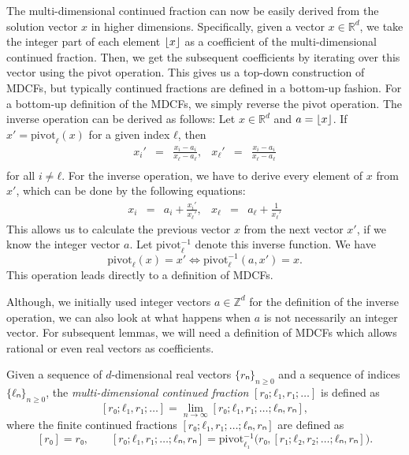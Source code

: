 The multi-dimensional continued fraction can now be easily derived from the
solution vector $x$ in higher dimensions.
Specifically, given a vector $x ∈ ℝ^d$, we take the integer part of each
element $\lfloor x\rfloor$ as a coefficient of the multi-dimensional continued
fraction.
Then, we get the subsequent coefficients by iterating over this vector using
the pivot operation.
This gives us a top-down construction of MDCFs, but typically continued
fractions are defined in a bottom-up fashion.
For a bottom-up definition of the MDCFs, we simply reverse the pivot operation.
The inverse operation can be derived as follows:
Let $x ∈ ℝ^d$ and $a = \lfloor x\rfloor$.
If $x' = \mathrm{pivot}_ℓ(x)$ for a given index $ℓ$, then
\[
  \begin{array}{lcrlcr}
    \displaystyle x_i' & = & \displaystyle \frac{x_i - a_i}{x_ℓ - a_ℓ}, &
    \displaystyle x_ℓ' & = & \displaystyle \frac{x_i - a_i}{x_ℓ - a_ℓ} \\[1em]
  \end{array}
\]
for all $i ≠ ℓ$.
For the inverse operation, we have to derive every element of $x$ from $x'$,
which can be done by the following equations:
\[
  \begin{array}{lcrlcr}
    \displaystyle x_i & = & a_i + \displaystyle \frac{x_i'}{x_ℓ'}, &
    \displaystyle x_ℓ & = & a_ℓ + \displaystyle \frac{1}{x_ℓ'}
  \end{array}
\]
This allows us to calculate the previous vector $x$ from the next vector $x'$,
if we know the integer vector $a$.
Let $\mathrm{pivot}_ℓ^{-1}$ denote this inverse function.
We have
\[
  \mathrm{pivot}_ℓ(x) = x' \iff \mathrm{pivot}_ℓ^{-1}(a, x') = x.
\]
This operation leads directly to a definition of MDCFs.

Although, we initially used integer vectors $a ∈ ℤ^d$ for the definition of the inverse operation,
we can also look at what happens when $a$ is not necessarily an integer vector.
For subsequent lemmas, we will need a definition of MDCFs which allows rational
or even real vectors as coefficients.

\begin{definition}
  Given a sequence of $d$-dimensional real vectors $\{rₙ\}_{n ≥ 0}$ and a sequence of
  indices $\{ℓₙ\}_{n ≥ 0}$, the \emph{multi-dimensional continued fraction} $[r₀; ℓ₁, r₁; …]$
  is defined as
  \[
    [r₀; ℓ₁, r₁; …] = \lim_{n → ∞} [r₀; ℓ₁, r₁; …; ℓₙ, rₙ],
  \]
  where the finite continued fractions $[r₀; ℓ₁, r₁; …; ℓₙ, rₙ]$ are defined as
  \[
    [r₀] = r₀, \qquad [r₀; ℓ₁, r₁; …; ℓₙ, rₙ] = \mathrm{pivot}_{ℓ₁}^{-1}\big(r₀, [r₁; ℓ₂, r₂; …; ℓₙ, rₙ]\big).
  \]
\end{definition}

